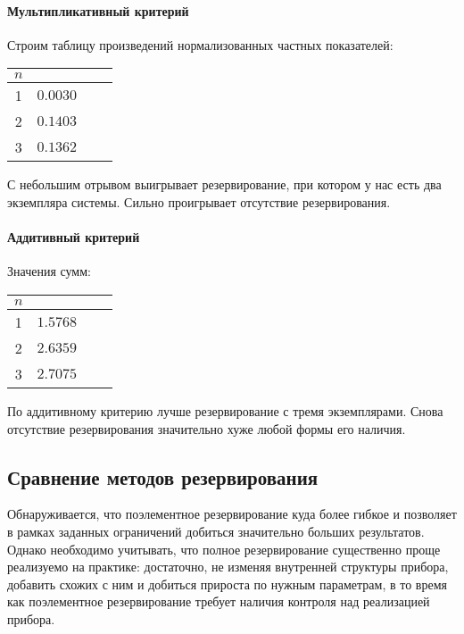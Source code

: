 \documentclass[12pt, a4paper] {ncc}
\begin{document}
\paragraph{Мультипликативный критерий} Строим таблицу произведений
нормализованных частных показателей:

\begin{tabular}{|c|c|c||c|}
\hline
$n$ &          \\ \hline
1   & $0.0030$ \\ \hline
2   & $0.1403$ \\ \hline
3   & $0.1362$ \\ \hline
\end{tabular}

С небольшим отрывом выигрывает резервирование, при котором у нас есть два
экземпляра системы. Сильно проигрывает отсутствие резервирования.

\paragraph{Аддитивный критерий} Значения сумм:

\begin{tabular}{|c|c|c||c|}
\hline
$n$ &          \\ \hline
1   & $1.5768$ \\ \hline
2   & $2.6359$ \\ \hline
3   & $2.7075$ \\ \hline
\end{tabular}

По аддитивному критерию лучше резервирование с тремя экземплярами. Снова
отсутствие резервирования значительно хуже любой формы его наличия.

\subsection*{Сравнение методов резервирования}

Обнаруживается, что поэлементное резервирование куда более гибкое и позволяет в
рамках заданных ограничений добиться значительно больших результатов. Однако
необходимо учитывать, что полное резервирование существенно проще реализуемо на
практике: достаточно, не изменяя внутренней структуры прибора, добавить схожих с
ним и добиться прироста по нужным параметрам, в то время как поэлементное
резервирование требует наличия контроля над реализацией прибора.
\end{document}
